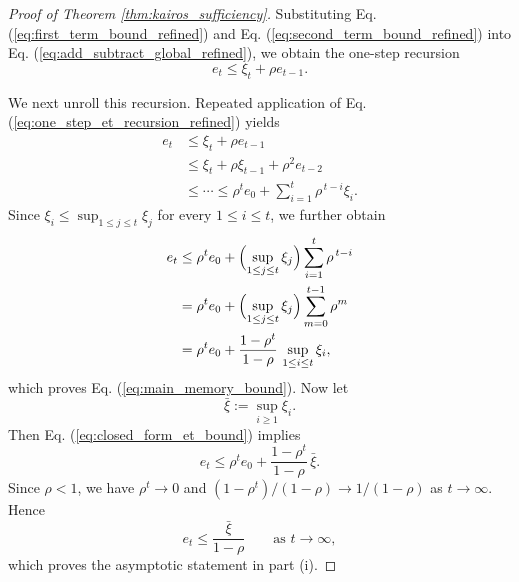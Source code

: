 \begin{proof}[Proof of Theorem \ref{thm:kairos_sufficiency}]
Substituting Eq. (\ref{eq:first_term_bound_refined}) and Eq. (\ref{eq:second_term_bound_refined}) into Eq. (\ref{eq:add_subtract_global_refined}), we obtain the one-step recursion
\begin{equation}
e_t \le \xi_t + \rho e_{t-1}.
\label{eq:one_step_et_recursion_refined}
\end{equation}

We next unroll this recursion. Repeated application of Eq. (\ref{eq:one_step_et_recursion_refined}) yields
\begin{align}
e_t
&\le
\xi_t + \rho e_{t-1}
\nonumber\\
&\le
\xi_t + \rho \xi_{t-1} + \rho^2 e_{t-2}
\nonumber\\
&\le \cdots \le
\rho^t e_0 + \sum_{i=1}^{t}\rho^{\,t-i}\xi_i.
\label{eq:unrolled_global_recursion}
\end{align}
Since $\xi_i \le \sup_{1\le j\le t}\xi_j$ for every $1\le i\le t$, we further obtain
\begin{align}
e_t
&\le
\rho^t e_0 + \Bigl(\sup_{1\le j\le t}\xi_j\Bigr)\sum_{i=1}^{t}\rho^{\,t-i}
\nonumber\\
&=
\rho^t e_0 + \Bigl(\sup_{1\le j\le t}\xi_j\Bigr)\sum_{m=0}^{t-1}\rho^m
\nonumber\\
&=
\rho^t e_0 + \frac{1-\rho^t}{1-\rho}\,\sup_{1\le i\le t}\xi_i,
\label{eq:closed_form_et_bound}
\end{align}
which proves Eq. (\ref{eq:main_memory_bound}). Now let
\[
\bar\xi := \sup_{i\ge 1}\xi_i.
\]
Then Eq. (\ref{eq:closed_form_et_bound}) implies
\begin{equation}
e_t
\le
\rho^t e_0 + \frac{1-\rho^t}{1-\rho}\,\bar\xi.
\label{eq:closed_form_et_bound_uniform}
\end{equation}
Since $\rho<1$, we have $\rho^t\to 0$ and $(1-\rho^t)/(1-\rho)\to 1/(1-\rho)$ as $t\to\infty$. Hence
\begin{equation}
e_t \le \frac{\bar\xi}{1-\rho}
\qquad \text{as } t\to\infty,
\label{eq:et_asymptotic_refined}
\end{equation}
which proves the asymptotic statement in part \textup{(i)}.


\end{proof}
